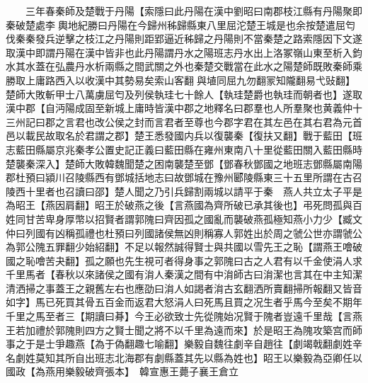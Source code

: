 　　三年春秦師及楚戰于丹陽【索隱曰此丹陽在漢中劉昭曰南郡枝江縣有丹陽聚即秦破楚處李輿地紀勝曰丹陽在今歸州秭歸縣東八里屈沱楚王城是也余按楚遣屈匄伐秦秦發兵逆擊之枝江之丹陽則距郢逼近秭歸之丹陽則不當秦楚之路索隱因下文遂取漢中即謂丹陽在漢中皆非也此丹陽謂丹水之陽班志丹水出上洛冢嶺山東至析入鈞水其水蓋在弘農丹水析兩縣之間武關之外也秦楚交戰當在此水之陽楚師既敗秦師乘勝取上庸路西入以收漢中其勢易矣索山客翻與埴同屈九勿翻冡知隴翻易弋䜴翻】楚師大敗斬甲士八萬虜屈匄及列侯執珪七十餘人【執珪楚爵也執珪而朝者也】遂取漢中郡【自沔陽成固至新城上庸時皆漢中郡之地釋名曰郡羣也人所羣聚也黄義仲十三州記曰郡之言君也改公侯之封而言君者至尊也今郡字君在其左邑在其右君為元首邑以載民故取名於君謂之郡】楚王悉發國内兵以復襲秦【復扶又翻】戰于藍田【班志藍田縣屬京兆秦孝公置史記正義曰藍田縣在雍州東南八十里從藍田關入藍田縣時楚襲秦深入】楚師大敗韓魏聞楚之困南襲楚至鄧【鄧春秋鄧國之地班志鄧縣屬南陽郡杜預曰潁川召陵縣西有鄧城括地志曰故鄧城在豫州郾陵縣東三十五里所謂在古召陵西十里者也召讀曰邵】楚人聞之乃引兵歸割兩城以請平于秦　燕人共立太子平是為昭王【燕因肩翻】昭王於破燕之後【言燕國為齊所破已承其後也】弔死問孤與百姓同甘苦卑身厚幣以招賢者謂郭隗曰齊因孤之國亂而襲破燕孤極知燕小力少【臧文仲曰列國有凶稱孤禮也杜預曰列國諸侯無凶則稱寡人郭姓出於周之虢公世亦謂虢公為郭公隗五罪翻少始紹翻】不足以報然誠得賢士與共國以雪先王之恥【謂燕王噲破國之恥噲苦夬翻】孤之願也先生視可者得身事之郭隗曰古之人君有以千金使涓人求千里馬者【春秋以來諸侯之國有㳙人秦漢之間有中㳙師古曰㳙潔也言其在中主知潔清洒掃之事蓋王之親舊左右也應劭曰㳙人如謁者㳙古玄翻洒所賣翻掃所報翻又皆音如字】馬已死買其骨五百金而返君大怒涓人曰死馬且買之况生者乎馬今至矣不期年千里之馬至者三【期讀曰朞】今王必欲致士先從隗始况賢于隗者豈遠千里哉【言燕王若加禮於郭隗則四方之賢士聞之將不以千里為遠而來】於是昭王為隗攻築宫而師事之于是士爭趣燕【為于偽翻趣七喻翻】樂毅自魏往劇辛自趙往【劇竭戟翻劇姓辛名劇姓莫知其所自出班志北海郡有劇縣蓋其先以縣為姓也】眧王以樂毅為亞卿任以國政【為燕用樂毅破齊張本】　韓宣惠王薨子襄王倉立


